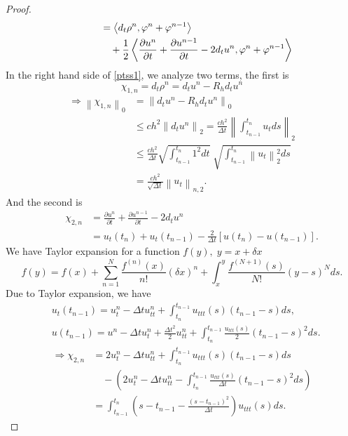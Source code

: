 \documentclass[notitlepage,a4paper,fleqn,9pt]{icmfarticle}
\begin{document}
\begin{multicols}{2}
\begin{proof}
\begin{align}
		&\qquad\quad=\left\langle d_t\rho^n, \varphi^n+\varphi^{n-1}\right\rangle\notag\\
		&\qquad\qquad+\frac{1}{2}\left\langle \frac{\partial u^n}{\partial t}+\frac{\partial u^{n-1}}{\partial t}-2d_tu^n, \varphi^n+\varphi^{n-1}\right\rangle \label{ptss1}
	\end{align}
	In the right hand side of \eqref{ptss1}, we analyze two terms, the first is 
	$$\chi_{1,n}=d_t\rho^n=d_tu^n-R_hd_tu^n$$
	\begin{align*}
		\Rightarrow\left\|\chi_{1,n}\right\|_0&=\left\|d_tu^n-R_hd_tu^n\right\|_0\\
		&\leq ch^2\left\|d_tu^n\right\|_2
		=\frac{ch^2}{\Delta t}\left\|\int_{t_{n-1}}^{t_n}u_tds\right\|_2\\
		&\leq \frac{ch^2}{\Delta t}\sqrt{\int_{t_{n-1}}^{t_n}1^2dt}\;\sqrt{\int_{t_{n-1}}^{t_n} \left\|u_t\right\|_2^2ds}\\
		&=\frac{ch^2}{\sqrt{\Delta t}}\left\|u_t\right\|_{n, 2}.
	\end{align*}
	And the second is
	\begin{align*}
		\qquad\chi_{2,n}&=\frac{\partial u^n}{\partial t}+\frac{\partial u^{n-1}}{\partial t}-2d_tu^n\\
		&=u_t(t_n)+u_t(t_{n-1})-\frac{2}{\Delta t}\left[u(t_n)-u(t_{n-1})\right].
	\end{align*}
	We have Taylor expansion for a function $f(y),\; y=x + \delta x$
	$$f(y)=f(x)+\sum_{n=1}^{N}\frac{f^{(n)}(x)}{n!}(\delta x)^n+\int_{x}^{y}\frac{f^{(N+1)}(s)}{N!}(y-s)^Nds.$$
	Due to Taylor expansion, we have
	\begin{align*}
		&u_t(t_{n-1})=u_t^n-\Delta tu_{tt}^n+\int_{t_n}^{t_{n-1}} u_{ttt}(s)(t_{n-1}-s)ds,\\
		&u(t_{n-1})=u^n-\Delta tu_{t}^n+\frac{\Delta t^2}{2}u_{tt}^n+\int_{t_n}^{t_{n-1}} \frac{u_{ttt}(s)}{2}(t_{n-1}-s)^2ds.
	\end{align*}
	\begin{align*}
		\Rightarrow \chi_{2,n}&=2u^n_t-\Delta tu_{tt}^n+\int_{t_n}^{t_{n-1}} u_{ttt}(s)(t_{n-1}-s)ds\\
		&\quad-\left(2u_{t}^n-\Delta tu_{tt}^n-\int_{t_n}^{t_{n-1}} \frac{u_{ttt}(s)}{\Delta t}(t_{n-1}-s)^2ds\right)\\
		&=\int_{t_{n-1}}^{t_n}\left(s-t_{n-1}-\frac{(s-t_{n-1})^2}{\Delta t}\right)u_{ttt}(s)ds.
	\end{align*}

\end{proof}
\end{multicols}
\end{document}
